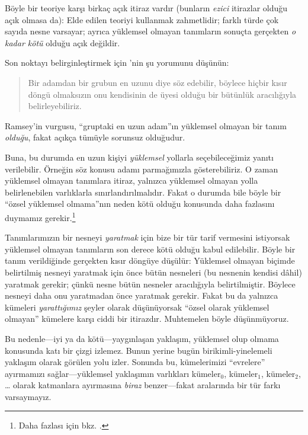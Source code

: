 \documentclass[../../../include/open-logic-section]{subfiles}
\begin{document}
Böyle bir teoriye karşı birkaç açık itiraz vardır (bunların \emph{ezici}
itirazlar olduğu açık olmasa da): Elde edilen teoriyi kullanmak zahmetlidir;
farklı türde çok sayıda nesne varsayar; ayrıca yüklemsel olmayan tanımların
sonuçta gerçekten \emph{o kadar kötü} olduğu açık değildir.

Son noktayı belirginleştirmek için \citeauthor{Ramsey1925}'nin şu
yorumunu düşünün:
\begin{quote}
  Bir adamdan bir grubun en uzunu diye söz edebilir, böylece hiçbir kısır
  döngü olmaksızın onu kendisinin de üyesi olduğu bir bütünlük aracılığıyla
  belirleyebiliriz. \citep{Ramsey1925}
\end{quote}
Ramsey'in vurgusu, ``gruptaki en uzun adam''ın yüklemsel olmayan bir tanım
\emph{olduğu}, fakat açıkça tümüyle sorunsuz olduğudur.

Buna, bu durumda en uzun kişiyi \emph{yüklemsel} yollarla seçebileceğimiz
yanıtı verilebilir. Örneğin söz konusu adamı parmağımızla gösterebiliriz.
O zaman yüklemsel olmayan tanımlara itiraz, yalnızca yüklemsel olmayan yolla
belirlenebilen varlıklarla sınırlandırılmalıdır. Fakat o durumda bile böyle
bir ``özsel yüklemsel olmama''nın neden kötü olduğu konusunda daha fazlasını
duymamız gerekir.\footnote{Daha fazlası için bkz. \citet{Linnebo2010}.}

Tanımlarımızın bir nesneyi \emph{yaratmak} için bize bir tür tarif vermesini
istiyorsak yüklemsel olmayan tanımların son derece kötü olduğu kabul
edilebilir. Böyle bir tanım verildiğinde gerçekten kısır döngüye düşülür:
Yüklemsel olmayan biçimde belirtilmiş nesneyi yaratmak için önce bütün
nesneleri (bu nesnenin kendisi dâhil) yaratmak gerekir; çünkü nesne bütün
nesneler aracılığıyla belirtilmiştir. Böylece nesneyi daha onu yaratmadan
önce yaratmak gerekir. Fakat bu da yalnızca kümeleri \emph{yarattığımız}
şeyler olarak düşünüyorsak ``özsel olarak yüklemsel olmayan'' kümelere karşı
ciddi bir itirazdır. Muhtemelen böyle düşünmüyoruz.

Bu nedenle---iyi ya da kötü---yaygınlaşan yaklaşım, yüklemsel olup olmama
konusunda katı bir çizgi izlemez. Bunun yerine bugün birikimli-yinelemeli
yaklaşım olarak görülen yolu izler. Sonunda bu, kümelerimizi ``evrelere''
ayırmamızı sağlar---yüklemsel yaklaşımın varlıkları kümeler$_0$,
kümeler$_1$, kümeler$_2$, \ldots{} olarak katmanlara ayırmasına \emph{biraz}
benzer---fakat aralarında bir tür farkı varsaymayız.
\end{document}
